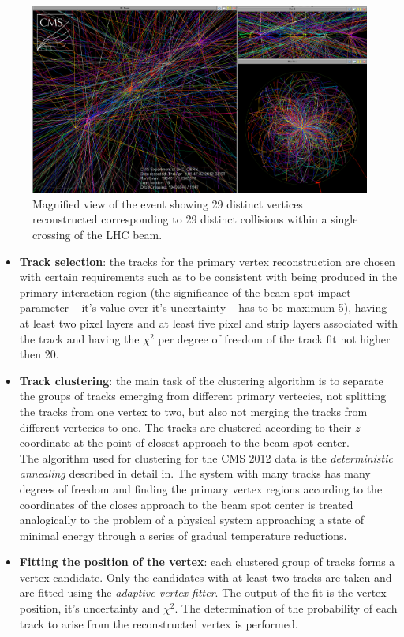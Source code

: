 \begin{figure}[t]
  \centering
  \includegraphics[width=1.0\textwidth]{04_event_reconstruction/plots/url.png}
  \caption{Magnified view of the event showing 29 distinct vertices reconstructed corresponding to 29 distinct collisions within a single crossing of the LHC beam.}
  \label{fig:HugePU}
\end{figure}
\begin{itemize}

 \item \textbf{Track selection}: the tracks for the primary vertex reconstruction are chosen with certain requirements such as to be consistent with being produced 
 in the primary interaction region (the significance of the beam spot impact parameter -- it's value over it's uncertainty -- has to be maximum 5), having at least two pixel 
 layers and at least five pixel and strip layers associated with the track and having the $\chi^{2}$ per degree of freedom of the track fit not higher then 20.
 \item \textbf{Track clustering}: the main task of the clustering algorithm is to separate the groups of tracks emerging from different primary vertecies, not splitting 
 the tracks from one vertex to two, but also not merging the tracks from different vertecies to one. The tracks are clustered according 
 to their $z$-coordinate at the point of closest approach to the beam spot center. 
 \\
 The algorithm used for clustering for the CMS 2012 data is the \textit{deterministic annealing} described in detail in\cite{rose_ieee1998}. The system with many tracks has many degrees
 of freedom and finding the primary vertex regions according to the coordinates of the closes approach to the beam spot center is treated analogically to the problem of a physical 
 system approaching a state of minimal energy through a series of gradual temperature reductions.
 \item \textbf{Fitting the position of the vertex}: each clustered group of tracks forms a vertex candidate. Only the candidates with at least two tracks are taken and are fitted
 using the \textit{adaptive vertex fitter}\cite{Frühwirth:1027031}. The output of the fit is the vertex position, it's uncertainty and $\chi^{2}$. The determination of the probability
 of each track to arise from the reconstructed vertex is performed.
\end{itemize}

